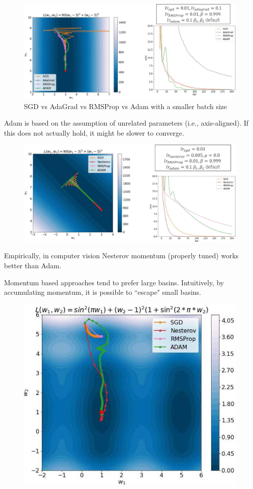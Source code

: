 \begin{description}
        \begin{figure}[H]
            \centering
            \includegraphics[width=0.75\linewidth]{./img/adam_noisy.jpg}
            \caption{SGD vs AdaGrad vs RMSProp vs Adam with a smaller batch size}
        \end{figure}

        \begin{remark}
            Adam is based on the assumption of unrelated parameters (i.e., axis-aligned). If this does not actually hold, it might be slower to converge.

            \begin{figure}[H]
                \centering
                \includegraphics[width=0.8\linewidth]{./img/optimizers_no_align.jpg}
            \end{figure}
        \end{remark}
\end{description}

\begin{remark}
    Empirically, in computer vision Nesterov momentum (properly tuned) works better than Adam.
\end{remark}

\begin{remark}
    Momentum based approaches tend to prefer large basins. Intuitively, by accumulating momentum, it is possible to ``escape" small basins.

    \begin{figure}[H]
        \centering
        \includegraphics[width=0.35\linewidth]{./img/momentum_local_global.jpg}
    \end{figure}
\end{remark}


